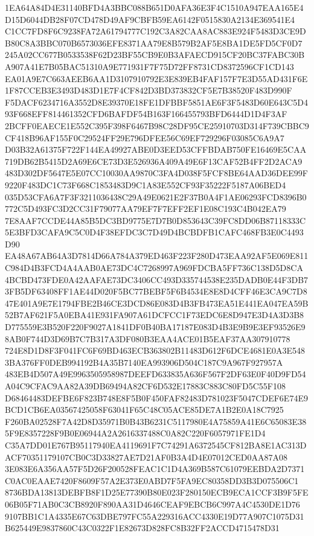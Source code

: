 \documentclass[UTF8,fontset=fandol,zihao=-4,a4paper]{ctexart}
\begin{document}
{{1EA64A84D4E31140BFD4A3BBC088B651D0AFA36E3F4C1510A947EAA165E4D15D6044DB28F07CD478D49AF9CBFB59EA6142F0515830A2134E369541E4
C1CC7FD8F6C9238FA72A61794777C192C3A82CAA8AC883E924F5483D3CE9DB80C8A3BBC070B6573036EFE8371AA79E8B579B2AF5E8BA1DE5FD5CF0D7
245A02CC677B0533538F62D23BF55CB9E0B3AFAECD915CF20BC37FABC30BA907A41E7B05BAC51310A9E771931F7F75D72FF8731CD8372596CF1CD143
EA01A9E7C663AEEB6AA1D3107910792E3E839EB4FAF157F7E3D55AD431F6E1F87CCEB3E3493D483D1E7F4CF842D3BD373832CF5E7B38520F483D990F
F5DACF6234716A3552D8E39370E18FE1DFBBF5851AE6F3F5483D60E643C5D493F668EFF814461352CFD6BAFDF54B163F166455793BFD6444D1D4F3AF
2BCFF0EAECE1E552C395F398F6467B98C28DF95CE25910703D314F739CBBC9CF418B96AF155F0C29524FF29E796DFEE56C69EF729296F03085C6A9A7
D03B32A61375F722F144EA49927ABE0D3EED53CFFBDAB750FE16469E5CAA719DB62B5415D2A69E6CE73D3E526936A409A49E6F13CAF52B4FF2D2ACA9
483D302DF5647E5E07CC10030AA9870C3FA4D038F5FCF8BE64AAD36DEE99F9220F483DC1C73F668C1853483D9C1A83E552CF93F35222F5187A06BED4
035D53CFA6A7F3F3211036438C29A49E0621E2F37B0A4F1AE06293FCD8396B0772C5D493FC3D2CC31F79077AA79EF7F7EFF2EF1E08C193C4B042EA79
7E8AAF7CCDE44A85B5DC3BD9775E7D7B0D853643C39FC8DD06B87118333C5E3BFD3CAFA9C5C0D4F38EFDC3C7D49D4BCBDFB1CAFC468FB3E0C4493D90
EA48A67AB64A3D7814D66A784A379ED463F223F280D473EAA92AF5E069E811C984D4B3FCD4A4AAB0AE73DC4C7268997A969FDCBA5FF736C138D5D8CA
4BCBD473FDE0A42AAFAE73DC3406CC493D335744538E235DADB0E44F3DB73FB5DF63408FF1AE44D020F5BC77BEBF5F6B4534E8E8D4CFF46E3CA9C7D8
47E401A9E7E1794FBE2B46CE3DCD86E083D4B3FB473EA51E441EA047EA59B52B7AF621F5A0EBA41E931FA907A61DCFCC1F73EDC6E8D947E3D4A3D3B8
D775559E3B520F220F9027A1841DF0B40BA17187E083D4B3E9B9E3EF93526E98AB0F744D3D69B7C7B317A3DF080B3EAA4ACE01B5EAF37AA307910778
724E8D1D8F3F041FC6F69BD463ECB363802B11483D612F6DCE4681E0A3E5483BA376FF0DEB994192B4A35B7140EA993906D504C187C9A967F927957A
483EB4D507A49E9963505958987DEEFD633835A636F567F2DF63E0F40D9FD54A04C9CFAC9AA82A39DB69494A82CF6D532E17883C883C80FD5C55F108
D68464483DEFBE6F823B748E8F5B0F450FAF82483D781023F5047CDEF6E74E9BCD1CB6EA03567425058F63041F65C48C05ACE85DE7A1B2E0A18C7925
F260BA02528F7A42D8D35971B0B43B6231C5117980E4A75859A41E6C65083E385F9E8357228F9B0E06944A2A2616337488C0A82C220F6057971FE1D4
C35A7DD01E767B95117940EA4119691F7C74291A6372545CF812BA8E1AC313DACF70351179107CB0C3D33827AE7D21AF0B3A4D4E07012CED0AA87A08
3E083E6A356AA57F5D26F200528FEAC1C1D4A369B587C61079EEBDA2D7371C0AC0EAAE7420F8609F57A2E373E0ABD7F5FA9EC80358DD3B3D075506C1
8736BDA13813DEBFB8F1D25E77390B80E023F280150ECB9ECA1CCF3B9F5FE06B05F71AB0C3CB8920F890AA31D4646CEAF9EBCB6C997A4C4530DE1D76
9107BB1C1A4335E67C63DBE797FC55A229316ACC4330E19D77A907C1075D31B625449E9837860C43C0322F1E82673D828FC8B32FF2ACCD4715478D31
}}
\end{document}
